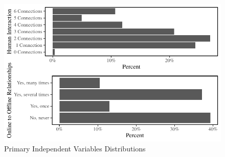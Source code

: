 \documentclass[]{interact}
\theoremstyle{plain}%
\theoremstyle{definition}
\theoremstyle{remark}
\begin{document}
\begin{figure}

{\centering \includegraphics{Social-Isolation-in-China-jg-revised_files/figure-pdf/fig-var-dist-1.pdf}

}

\caption{\label{fig-var-dist}Primary Independent Variables
Distributions}

\end{figure}
\end{document}
